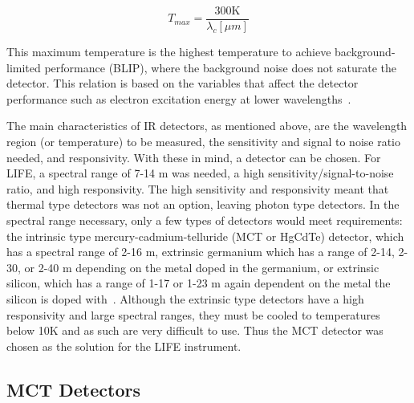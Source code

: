 \begin{equation}\label{IR_detector_temp_rel}
    T_{max} = \frac{300\mathrm{K}}{\lambda_c[\mu m]}
\end{equation}

This maximum temperature is the highest temperature to achieve background-limited performance (BLIP), where the background noise does not saturate the detector. This relation is based on the variables that affect the detector performance such as electron excitation energy at lower wavelengths~\citep{IR_detector_textbook}. 

The main characteristics of IR detectors, as mentioned above, are the wavelength region (or temperature) to be measured, the sensitivity and signal to noise ratio needed, and responsivity. With these in mind, a detector can be chosen. For LIFE, a spectral range of 7-14 \textmu m was needed, a high sensitivity/signal-to-noise ratio, and high responsivity. The high sensitivity and responsivity meant that thermal type detectors was not an option, leaving photon type detectors. In the spectral range necessary, only a few types of detectors would meet requirements: the intrinsic type mercury-cadmium-telluride (MCT or HgCdTe) detector, which has a spectral range of 2-16 \textmu m, extrinsic germanium which has a range of 2-14, 2-30, or 2-40 \textmu m depending on the metal doped in the germanium, or extrinsic silicon, which has a range of 1-17 or 1-23 \textmu m again dependent on the metal the silicon is doped with~\citep{hamamatsu_ir_detectors}. Although the extrinsic type detectors have a high responsivity and large spectral ranges, they must be cooled to temperatures below 10K and as such are very difficult to use. Thus the MCT detector was chosen as the solution for the LIFE instrument.

\subsection{MCT Detectors}\label{MCT_detectors}

